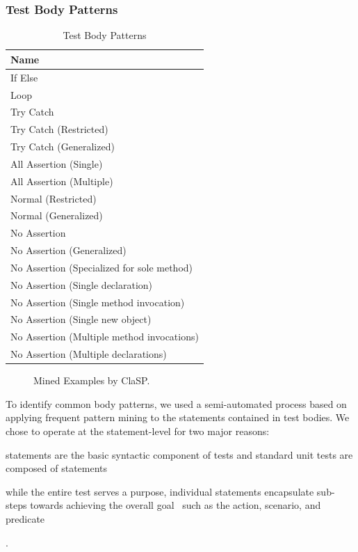 \subsubsection{Test Body Patterns}
\label{sec:body-patterns}

\begin{table}[t]
\scriptsize
\centering
\caption{Test Body Patterns}
\begin{tabular}{l} 
\toprule
\textbf{Name} \\
\midrule
If Else  \\
Loop  \\
Try Catch  \\
Try Catch (Restricted) \\
Try Catch (Generalized) \\
All Assertion (Single) \\
All Assertion (Multiple) \\
Normal (Restricted) \\
Normal (Generalized) \\
No Assertion \\
No Assertion (Generalized) \\
No Assertion (Specialized for sole method) \\
No Assertion (Single declaration) \\
No Assertion (Single method invocation) \\
No Assertion (Single new object) \\
No Assertion (Multiple method invocations) \\
No Assertion (Multiple declarations) \\
\bottomrule
\end{tabular}
\label{tab:body-patterns}
\end{table}

\begin{figure}[t]
\centering
    \begin{subfigure}{0.9\textwidth}
        \begin{footnotesize}
        
        \end{footnotesize}
    \end{subfigure}
\caption{Mined Examples by ClaSP.}
\label{ClaSP_examples}
\end{figure}


To identify common body patterns, we used a semi-automated process based on applying frequent pattern mining to the statements contained in test bodies.
%
We chose to operate at the statement-level for two major reasons:
\begin{enumerate*}
    \item statements are the basic syntactic component of tests and standard unit tests are composed of statements~\cite{JUnitCook}
    \item while the entire test serves a purpose, individual statements encapsulate sub-steps towards achieving the overall goal~\cite{lakhotia1993understanding} such as the action, scenario, and predicate
\end{enumerate*}.


